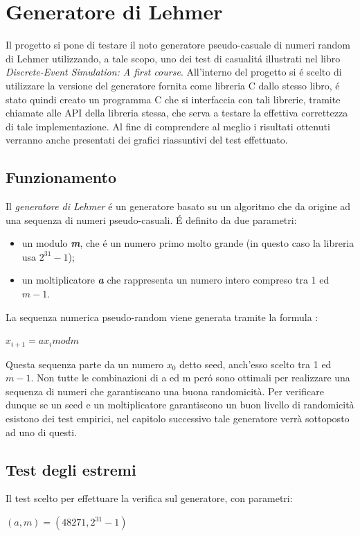 \chapter{Generatore di Lehmer}
	\label{cap:generatorerandom}

Il progetto si pone di testare il noto generatore pseudo-casuale di numeri 
random di Lehmer utilizzando, a tale scopo, uno dei test di casualit\'a 
illustrati nel libro \textit{Discrete-Event Simulation: A first course}.
All'interno del progetto si \'e scelto di utilizzare la versione del generatore
fornita come libreria C dallo stesso libro, \'e stato quindi creato un programma C
che si interfaccia con tali librerie, tramite chiamate alle API della libreria 
stessa,
che serva a testare la effettiva correttezza di tale implementazione.
Al fine di comprendere al meglio i risultati ottenuti verranno anche
presentati dei grafici riassuntivi del test effettuato.

\section{Funzionamento}
Il \textit{generatore di Lehmer} \'e un generatore basato su un algoritmo che da 
origine ad una sequenza di numeri pseudo-casuali. \'E definito da due parametri:

\begin{itemize}
 \item un modulo \textbf{\textit{m}}, che \'e un numero primo molto grande (in 
questo caso la libreria usa $2^{31} - 1$);
 \item un moltiplicatore \textbf{\textit{a}} che rappresenta un numero intero 
compreso tra 1 ed $m-1$.
\end{itemize}

\noindent La sequenza numerica pseudo-random viene generata tramite la formula :

\begin{center} $x_{i+1} = ax_{i} mod m$ \end{center}

\noindent Questa sequenza parte da un numero $x_{0}$ detto seed, anch'esso 
scelto tra 1 ed $m-1$. Non tutte le combinazioni di a ed m per\'o sono ottimali 
per realizzare una sequenza di numeri che garantiscano una buona randomicit\`a. 
Per verificare dunque se un seed e un moltiplicatore garantiscono un buon 
livello di 
randomicit\`a esistono dei test empirici, nel capitolo successivo tale generatore 
verr\`a sottoposto ad uno di questi.

\section{Test degli estremi}
Il test scelto per effettuare la verifica sul generatore, con parametri:
\begin{center}
$(a,m) = (48271, 2^{31} - 1)$
\end{center}

